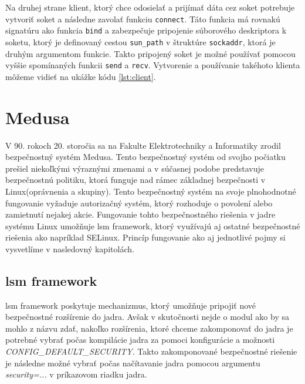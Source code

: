 Na druhej strane klient, ktorý chce odosielať a prijímať dáta cez soket potrebuje vytvoriť soket a následne zavolať funkciu \texttt{connect}. Táto funkcia má rovnakú signatúru ako funkcia \texttt{bind} a zabezpečuje pripojenie súborového deskriptora k soketu, ktorý je definovaný cestou \texttt{sun\_path} v štruktúre \texttt{sockaddr}, ktorá je druhým argumentom funkcie. Takto pripojený soket je možné používať pomocou vyššie spomínaných funkcii \texttt{send} a \texttt{recv}. Vytvorenie a používanie takéhoto klienta môžeme vidieť na ukážke kódu \ref{lst:client}.\cite{beej}

\section{Medusa} \label{medusa}
V 90. rokoch 20. storočia sa na Fakulte Elektrotechniky a Informatiky zrodil bezpečnostný systém Medusa. Tento bezpečnostný systém od svojho počiatku prešiel niekoľkými výraznými zmenami a v súčasnej podobe predstavuje bezpečnostnú politiku, ktorá funguje nad rámec základnej bezpečnosti v Linux(oprávnenia a skupiny). Tento bezpečnostný systém na svoje plnohodnotné fungovanie vyžaduje autorizačný systém, ktorý rozhoduje o povolení alebo zamietnutí nejakej akcie. Fungovanie tohto bezpečnostného riešenia v jadre systému Linux umožňuje \acrshort{lsm} framework, ktorý využívajú aj ostatné bezpečnostné riešenia ako napríklad \acrshort{SELinux}. Princíp fungovanie ako aj jednotlivé pojmy si vysvetlíme v nasledovný kapitolách.

\subsection{\acrshort{lsm} framework} \label{lsm}
\acrfull{lsm} framework poskytuje mechanizmus, ktorý umožňuje pripojiť nové bezpečnostné rozšírenie do jadra. Avšak v skutočnosti nejde o modul ako by sa mohlo z názvu zdať, nakoľko rozšírenia, ktoré chceme zakomponovať do jadra je potrebné vybrať počas kompilácie jadra za pomoci konfigurácie a možnosti \textit{CONFIG\_DEFAULT\_SECURITY}. Takto zakomponované bezpečnostné riešenie je následne možné vybrať počas načítavanie jadra pomocou argumentu \textit{security=...} v príkazovom riadku jadra.\cite{lsm}

